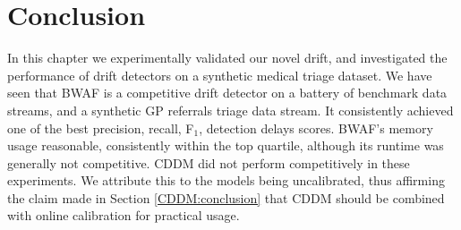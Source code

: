 
\section{Conclusion} \label{Experiments:conclusion}

In this chapter we experimentally validated our novel drift, and investigated the performance of drift detectors on a synthetic medical triage dataset. We have seen that BWAF is a competitive drift detector on a battery of benchmark data streams, and a synthetic GP referrals triage data stream. It consistently achieved one of the best precision, recall, F$_1$, detection delays scores. BWAF's memory usage reasonable, consistently within the top quartile, although its runtime was generally not competitive. CDDM did not perform competitively in these experiments. We attribute this to the models being uncalibrated, thus affirming the claim made in Section \ref{CDDM:conclusion} that CDDM should be combined with online calibration for practical usage.